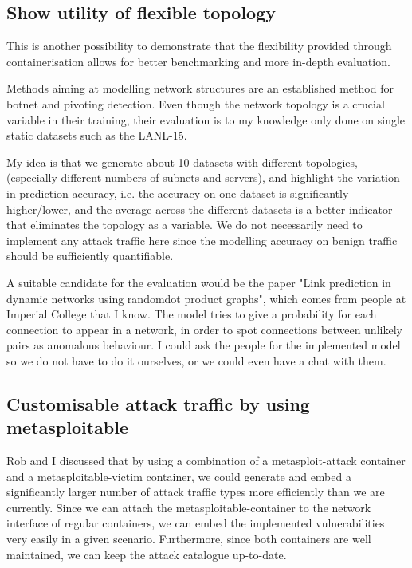 \documentclass[sigconf]{acmart}
\begin{document}
\subsection{Show utility of flexible topology}

This is another possibility to demonstrate that the flexibility provided through containerisation allows for better benchmarking and more in-depth evaluation.

Methods aiming at modelling network structures are an established method for botnet and pivoting detection. Even though the network topology is a crucial variable in their training, their evaluation is to my knowledge only done on single static datasets such as the LANL-15. 

My idea is that we generate about 10 datasets with different topologies, (especially different numbers of subnets and servers), and highlight the variation in prediction accuracy, i.e. the accuracy on one dataset is significantly higher/lower, and the average across the different datasets is a better indicator that eliminates the topology as a variable. We do not necessarily need to implement any attack traffic here since the modelling accuracy on benign traffic should be sufficiently quantifiable. 

A suitable candidate for the evaluation would be the paper "Link prediction in dynamic networks using randomdot product graphs", which comes from people at Imperial College that I know. The model tries to give a probability for each connection to appear in a network, in order to spot connections between unlikely pairs as anomalous behaviour. I could ask the people for the implemented model so we do not have to do it ourselves, or we could even have a chat with them.



\subsection{Customisable attack traffic by using metasploitable}

Rob and I discussed that by using a combination of a metasploit-attack container and a metasploitable-victim container, we could generate and embed a significantly larger number of attack traffic types more efficiently than we are currently. Since we can attach the metasploitable-container to the network interface of regular containers, we can embed the implemented vulnerabilities very easily in a given scenario. Furthermore, since both containers are well maintained, we can keep the attack catalogue up-to-date.
\end{document}
